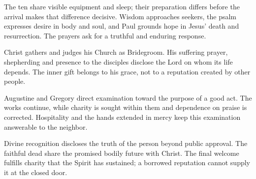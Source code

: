 \begin{fourSenses}
\item[Literal.] The ten share visible equipment and sleep; their preparation differs before the arrival makes that difference decisive. Wisdom approaches seekers, the psalm expresses desire in body and soul, and Paul grounds hope in Jesus' death and resurrection. The prayers ask for a truthful and enduring response.
\item[Allegorical.] Christ gathers and judges his Church as Bridegroom. His suffering prayer, shepherding and presence to the disciples disclose the Lord on whom its life depends. The inner gift belongs to his grace, not to a reputation created by other people.
\item[Moral.] Augustine and Gregory direct examination toward the purpose of a good act. The works continue, while charity is sought within them and dependence on praise is corrected. Hospitality and the hands extended in mercy keep this examination answerable to the neighbor.
\item[Anagogical.] Divine recognition discloses the truth of the person beyond public approval. The faithful dead share the promised bodily future with Christ. The final welcome fulfills charity that the Spirit has sustained; a borrowed reputation cannot supply it at the closed door.
\end{fourSenses}
